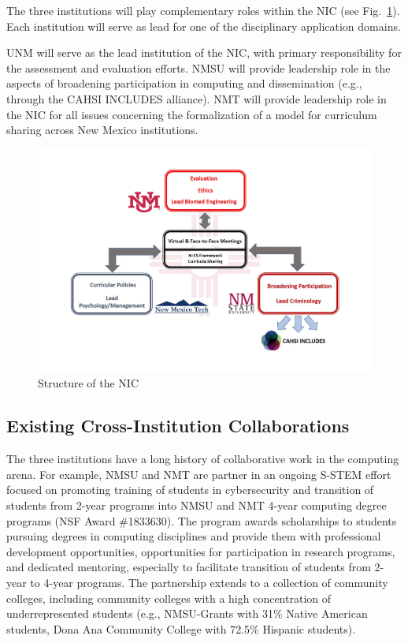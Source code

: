 The three institutions will play complementary roles within the NIC (see Fig.~\ref{nic}). Each institution will serve as lead for one of the disciplinary application domains.

UNM will serve as the lead institution of the NIC, with primary responsibility for the assessment and evaluation efforts.
NMSU will provide leadership role in the aspects of broadening participation in computing and dissemination (e.g., through the CAHSI INCLUDES alliance).
NMT will provide leadership role in the NIC for all issues concerning the formalization of a model for curriculum sharing across New Mexico institutions. 


\begin{figure}[htbp]
\centerline{\includegraphics[width=.8\textwidth]{nic.pdf}}
\caption{Structure of the NIC}
\label{nic}
\end{figure}

 


\subsection{Existing Cross-Institution Collaborations}
The three institutions have a long history of collaborative work in the computing arena. For example, NMSU and NMT are partner in an ongoing S-STEM effort focused on promoting training of students in cybersecurity and transition of students from 2-year programs into NMSU and NMT 4-year computing degree programs (NSF Award \#1833630). The program awards scholarships to students pursuing degrees in computing disciplines and provide them with professional development opportunities, opportunities for participation in research programs, and dedicated mentoring, especially to facilitate transition of students from 2-year to 4-year programs. The partnership extends to a collection of community colleges, including community colleges with a high concentration of underrepresented students (e.g., NMSU-Grants with 31\% Native American students, Dona Ana Community College with 72.5\% Hispanic students).

